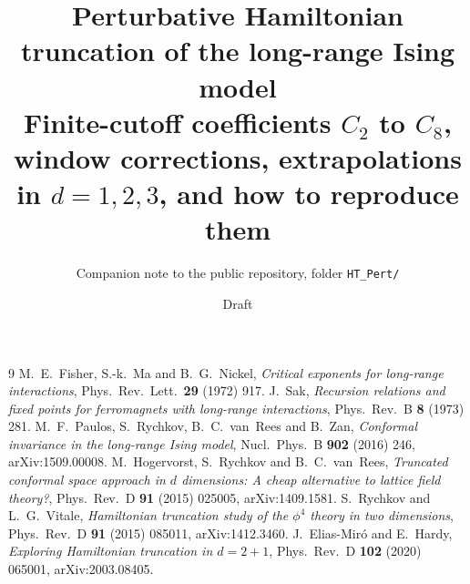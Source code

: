 \documentclass[11pt]{article}
\title{Perturbative Hamiltonian truncation of the long-range Ising model\\[2pt]
\large Finite-cutoff coefficients $C_2$ to $C_8$, window corrections, extrapolations in $d=1,2,3$, and how to reproduce them}
\author{Companion note to the public repository, folder \texttt{HT\_Pert/}}
\date{Draft}
\begin{document}
\maketitle
\tableofcontents







\appendix





\begin{thebibliography}{9}
 M.~E.~Fisher, S.-k.~Ma and B.~G.~Nickel, \emph{Critical exponents for long-range interactions}, Phys.\ Rev.\ Lett.\ \textbf{29} (1972) 917.
 J.~Sak, \emph{Recursion relations and fixed points for ferromagnets with long-range interactions}, Phys.\ Rev.\ B \textbf{8} (1973) 281.
 M.~F.~Paulos, S.~Rychkov, B.~C.~van~Rees and B.~Zan, \emph{Conformal invariance in the long-range Ising model}, Nucl.\ Phys.\ B \textbf{902} (2016) 246, arXiv:1509.00008.
 M.~Hogervorst, S.~Rychkov and B.~C.~van~Rees, \emph{Truncated conformal space approach in $d$ dimensions: A cheap alternative to lattice field theory?}, Phys.\ Rev.\ D \textbf{91} (2015) 025005, arXiv:1409.1581.
 S.~Rychkov and L.~G.~Vitale, \emph{Hamiltonian truncation study of the $\phi^4$ theory in two dimensions}, Phys.\ Rev.\ D \textbf{91} (2015) 085011, arXiv:1412.3460.
 J.~Elias-Mir\'o and E.~Hardy, \emph{Exploring Hamiltonian truncation in $d=2+1$}, Phys.\ Rev.\ D \textbf{102} (2020) 065001, arXiv:2003.08405.
\end{thebibliography}
\end{document}
